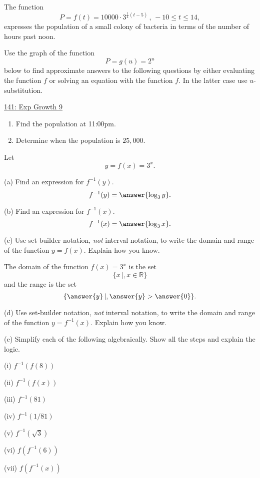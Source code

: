 \documentclass{ximera}
\begin{document}
\begin{question} \label{Qdferwer}
The function
\[
     P = f(t) = 10000 \cdot 3^{\frac{1}{4}(t-5)} \, , \, -10\leq t \leq 14,
\]
expresses the population of a small colony of bacteria in terms of the number of hours past noon.

Use the graph of the function 
\[
     P = g(u) = 2^u
\]
below to find approximate answers to the following questions by either evaluating the function $f$ or solving an equation with the function $f$. In the latter case use $u$-substitution.

\begin{onlineOnly}
    \begin{center}
\end{center}
\end{onlineOnly}

\href{https://www.desmos.com/calculator/fslkdtjqjl}{141: Exp Growth 9}

\begin{enumerate}
\item Find the population at 11:00pm.

\item Determine when the population is $25,000$.
\end{enumerate}
\end{question}





\begin{question}  \label{Q1:LogF}
Let 
\[
   y =  f(x) = 3^x .
\]

(a) Find an expression for $f^{-1}(y)$.
\[
      f^{-1}(y) = \answer{\log_3 y}.
\]

(b) Find an expression for $f^{-1}(x)$.
\[
   f^{-1}(x) = \answer{\log_3 x}.
\]

(c) Use set-builder notation, \emph{not} interval notation, to write the domain and range of the function $y=f(x)$. Explain how  you know.

The domain of the function $f(x) = 3^x$ is the set
\[
   \{   x \, | , x\in \mathbb{R}  \}
\]
and the range is the set
\[
    \{   \answer{y} \, | , \answer{y} > \answer{0}  \} .
\]

(d) Use set-builder notation, \emph{not} interval notation, to write the domain and range of the function $y=f^{-1}(x)$. Explain how  you know.

(e) Simplify each of the following algebraically. Show all the steps and explain the logic.

(i) $f^{-1}(f(8))$

(ii)  $f^{-1}(f(x))$

(iii) $f^{-1}(81)$

(iv) $f^{-1}(1/81)$

(v) $f^{-1} (\sqrt{3})$

(vi) $f(f^{-1}(6))$

(vii) $f(f^{-1}(x))$


\end{question}
\end{document}
